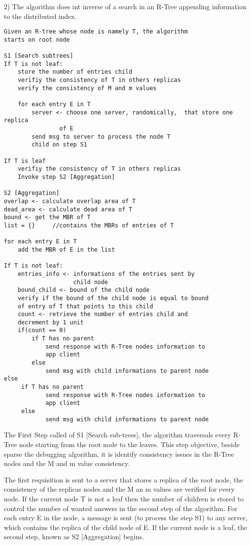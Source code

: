 2) The algorithm does int inverse of a search in an R-Tree appending information to the distributed index.
\begin{lstlisting}[frame=single,caption={RDebug Algorithm}]
Given an R-tree whose node is namely T, the algorithm 
starts on root node

S1 [Search subtrees]
If T is not leaf:
	store the number of entries child
	verifiy the consistency of T in others replicas
	verify the consistency of M and m values
	
	for each entry E in T
		server <- choose one server, randomically,  that store one replica 
				of E
		send msg to server to process the node T 
		child on step S1

If T is leaf
	verifiy the consistency of T in others replicas
	Invoke step S2 [Aggregation]

S2 [Aggregation]
overlap <- calculate overlap area of T
dead_area <- calculate dead area of T
bound <- get the MBR of T
list = {}     //contains the MBRs of entries of T

for each entry E in T
	add the MBR of E in the list
	
If T is not leaf:
    entries_info <- informations of the entries sent by 
    				child node
    bound_child <- bound of the child node
    verify if the bound of the child node is equal to bound 
    of entry of T that points to this child
    count <- retrieve the number of entries child and 
    decrement by 1 unit
    if(count == 0)
        if T has no parent
            send response with R-Tree nodes information to 
            app client
        else
            send msg with child informations to parent node
else
     if T has no parent
            send response with R-Tree nodes information to 
            app client
     else
            send msg with child informations to parent node
\end{lstlisting}
	
	The First Step called of S1 [Search sub-trees], the algorithm traversals every R-Tree node starting from the root node to the leaves. This step objective, beside sparse the debugging algorithm, it is identify consistency issues in the R-Tree nodes and the M and m value consistency.

	The first requisition is sent to a server that stores a replica of the root node, the consistency of the replicas nodes and the M an m values are verified for every node. If the current node T is not a leaf then the number of children is stored to control the number of wanted answers in the second step of the algorithm. For each entry E in the node, a message is sent (to process the step S1) to any server, which contains the replica of the child node of E. If the current node is a leaf, the second step, known as S2 [Aggregation] begins.
